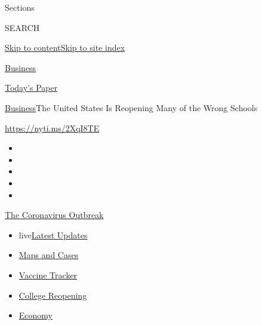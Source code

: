 Sections

SEARCH

\protect\hyperlink{site-content}{Skip to
content}\protect\hyperlink{site-index}{Skip to site index}

\href{https://www.nytimes.com/section/business}{Business}

\href{https://myaccount.nytimes.com/auth/login?response_type=cookie\&client_id=vi}{}

\href{https://www.nytimes.com/section/todayspaper}{Today's Paper}

\href{/section/business}{Business}\textbar{}The United States Is
Reopening Many of the Wrong Schools

\url{https://nyti.ms/2XqI8TE}

\begin{itemize}
\item
\item
\item
\item
\item
\end{itemize}

\href{https://www.nytimes.com/news-event/coronavirus?action=click\&pgtype=Article\&state=default\&region=TOP_BANNER\&context=storylines_menu}{The
Coronavirus Outbreak}

\begin{itemize}
\tightlist
\item
  live\href{https://www.nytimes.com/2020/08/03/world/coronavirus-covid-19.html?action=click\&pgtype=Article\&state=default\&region=TOP_BANNER\&context=storylines_menu}{Latest
  Updates}
\item
  \href{https://www.nytimes.com/interactive/2020/us/coronavirus-us-cases.html?action=click\&pgtype=Article\&state=default\&region=TOP_BANNER\&context=storylines_menu}{Maps
  and Cases}
\item
  \href{https://www.nytimes.com/interactive/2020/science/coronavirus-vaccine-tracker.html?action=click\&pgtype=Article\&state=default\&region=TOP_BANNER\&context=storylines_menu}{Vaccine
  Tracker}
\item
  \href{https://www.nytimes.com/2020/08/02/us/covid-college-reopening.html?action=click\&pgtype=Article\&state=default\&region=TOP_BANNER\&context=storylines_menu}{College
  Reopening}
\item
  \href{https://www.nytimes.com/live/2020/08/03/business/stock-market-today-coronavirus?action=click\&pgtype=Article\&state=default\&region=TOP_BANNER\&context=storylines_menu}{Economy}
\end{itemize}

